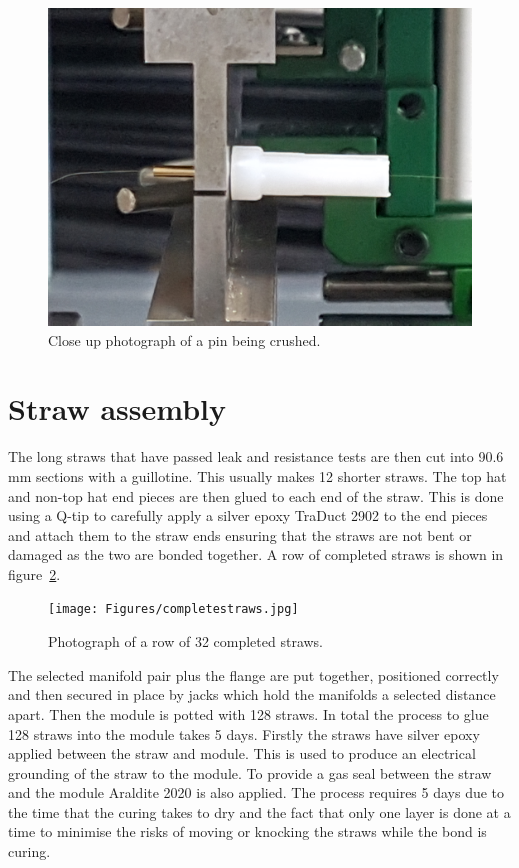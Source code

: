 \begin{figure}[ht]
\centering 
\includegraphics[scale=0.08]{Figures/pincrush.jpg}
\decoRule
\caption{Close up photograph of a pin being crushed.}
\label{fig:pincrush}
\end{figure}

\section{Straw assembly}
The long straws that have passed leak and resistance tests are then cut into 90.6 mm sections with a guillotine. This usually makes 12 shorter straws. The top hat and non-top hat end pieces are then glued to each end of the straw. This is done using a Q-tip to carefully apply a silver epoxy TraDuct 2902 \cite{silverepoxy} to the end pieces and attach them to the straw ends ensuring that the straws are not bent or damaged as the two are bonded together. A row of completed straws is shown in figure~\ref{fig:completestraws}.

\begin{figure}[ht]
\centering 
\texttt{[image: Figures/completestraws.jpg]}
\decoRule
\caption{Photograph of a row of 32 completed straws.}
\label{fig:completestraws}
\end{figure}

The selected manifold pair plus the flange are put together, positioned correctly and then secured in place by jacks which hold the manifolds a selected distance apart. Then the module is potted with 128 straws. In total the process to glue 128 straws into the module takes 5 days. Firstly the straws have silver epoxy applied between the straw and module. This is used to produce an electrical grounding of the straw to the module. To provide a gas seal between the straw and the module Araldite 2020 is also applied. The process requires 5 days due to the time that the curing takes to dry and the fact that only one layer is done at a time to minimise the risks of moving or knocking the straws while the bond is curing.

